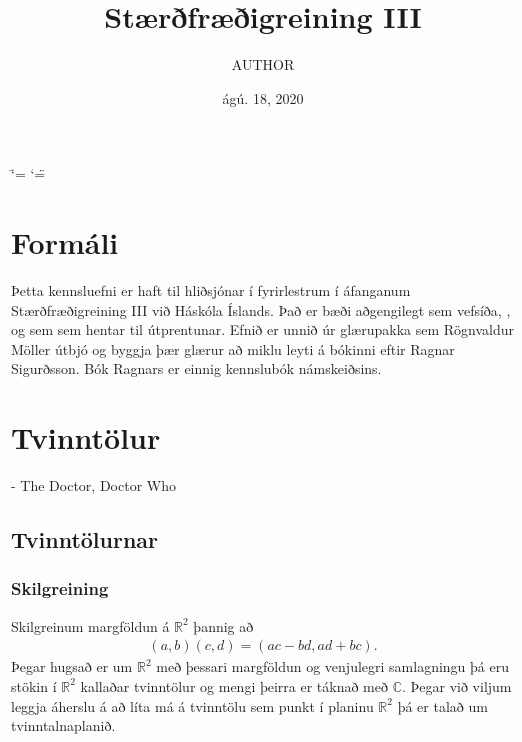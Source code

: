 \documentclass[a4paper,10pt,icelandic]{sphinxmanual}
\title{Stærðfræðigreining III}
\date{ágú. 18, 2020}
\author{AUTHOR}
\begin{document}
\ifdefined\shorthandoff
  \ifnum\catcode`\=\string=\active\shorthandoff{=}\fi
  \ifnum\catcode`\"=\active{}\fi
\fi

\pagestyle{empty}
\sphinxmaketitle
\pagestyle{plain}
\sphinxtableofcontents
\pagestyle{normal}
\label{\detokenize{index::doc}}



\chapter{Formáli}
\label{\detokenize{formali:formali}}\label{\detokenize{formali::doc}}
Þetta kennsluefni er haft til hliðsjónar í fyrirlestrum í áfanganum
Stærðfræðigreining III við Háskóla Íslands. Það er bæði aðgengilegt sem
vefsíða, , og sem  sem hentar
til útprentunar. Efnið er unnið úr glærupakka sem Rögnvaldur Möller útbjó og byggja þær glærur að miklu leyti á bókinni  eftir Ragnar Sigurðsson. Bók Ragnars er einnig kennslubók námskeiðsins.



\chapter{Tvinntölur}
\label{\detokenize{Kafli01:tvinntolur}}\label{\detokenize{Kafli01::doc}}

- The Doctor, Doctor Who


\section{Tvinntölurnar}
\label{\detokenize{Kafli01:tvinntolurnar}}

\subsection{Skilgreining}
\label{\detokenize{Kafli01:skilgreining}}
Skilgreinum margföldun á \(\mathbb{R}^2\) þannig að
\begin{equation*}
\begin{split}(a,b)(c,d)=(ac-bd, ad+bc).\end{split}
\end{equation*}
Þegar hugsað er um \(\mathbb{R}^2\) með þessari margföldun og venjulegri
samlagningu þá eru stökin í \(\mathbb{R}^2\) kallaðar tvinntölur og mengi
þeirra er táknað með \({\mathbb{C}}\). Þegar við viljum leggja áherslu á að
líta má á tvinntölu sem punkt í planinu \(\mathbb{R}^2\) þá er talað um
tvinntalnaplanið.
\end{document}
